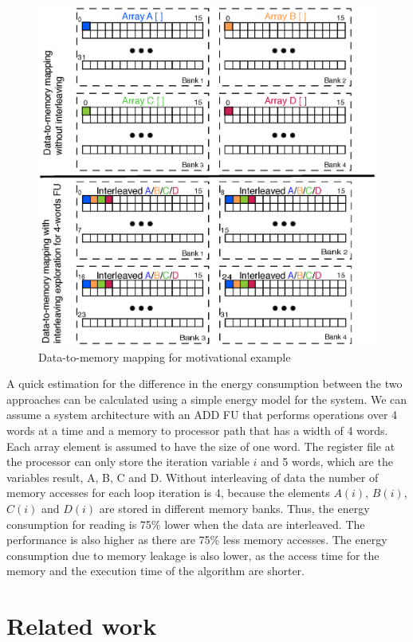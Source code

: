 \documentclass[prodmode,acmtodaes]{acmsmall}
\begin{document}
\begin{figure}
\centering
	\caption{Data-to-memory mapping for motivational example}	
	\label{fig:motivation}
	\includegraphics[scale = 0.5]{Images/motivation.eps}
\end{figure}

A quick estimation for the difference in the energy consumption between the two approaches can be calculated using a simple energy model for the system.
We can assume a system architecture with an ADD FU that performs operations over 4 words at a time and a memory to processor path that has a width of 4 words. 
Each array element is assumed to have the size of one word.
The register file at the processor can only store the iteration variable $i$ and 5 words, which are the variables result, A, B, C and D.
Without interleaving of data the number of memory accesses for each loop iteration is 4, because the elements $A(i)$, $B(i)$, $C(i)$ and $D(i)$ are stored in different memory banks.
Thus, the energy consumption for reading is 75\% lower when the data are interleaved.
The performance is also higher as there are 75\% less memory accesses.
The energy consumption due to memory leakage is also lower, as the access time for the memory and the execution time of the algorithm are shorter.

\section{Related work}
\label{sec:related}
\end{document}
